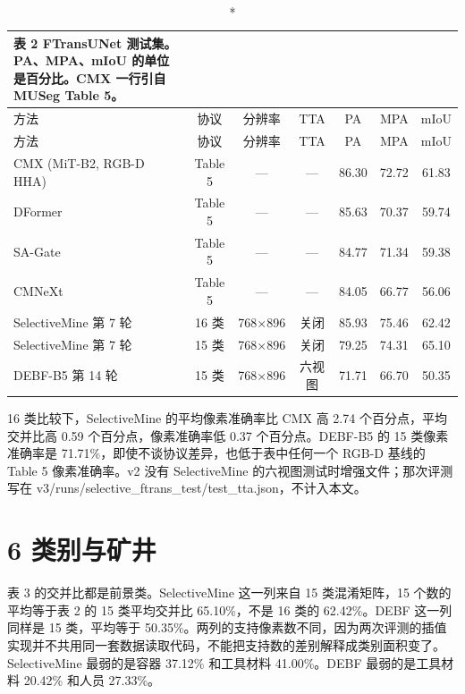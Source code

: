\documentclass[11pt]{article}
\begin{document}
{\footnotesize\setlength{\tabcolsep}{3pt}
\begin{longtable}{lcccccc}
\caption*{表 2  FTransUNet 测试集。PA、MPA、mIoU 的单位是百分比。CMX 一行引自 MUSeg Table 5。}\\
\toprule
方法 & 协议 & 分辨率 & TTA & PA & MPA & mIoU\\
\midrule
\endfirsthead
\toprule
方法 & 协议 & 分辨率 & TTA & PA & MPA & mIoU\\
\midrule
\endhead
CMX (MiT-B2, RGB-D HHA) & Table 5 & — & — & 86.30 & 72.72 & 61.83\\
DFormer & Table 5 & — & — & 85.63 & 70.37 & 59.74\\
SA-Gate & Table 5 & — & — & 84.77 & 71.34 & 59.38\\
CMNeXt & Table 5 & — & — & 84.05 & 66.77 & 56.06\\
SelectiveMine 第 7 轮 & 16 类 & 768×896 & 关闭 & 85.93 & 75.46 & 62.42\\
SelectiveMine 第 7 轮 & 15 类 & 768×896 & 关闭 & 79.25 & 74.31 & 65.10\\
DEBF-B5 第 14 轮 & 15 类 & 768×896 & 六视图 & 71.71 & 66.70 & 50.35\\
\bottomrule
\end{longtable}
}
16 类比较下，SelectiveMine 的平均像素准确率比 CMX 高 2.74 个百分点，平均交并比高 0.59 个百分点，像素准确率低 0.37 个百分点。DEBF-B5 的 15 类像素准确率是 71.71\%，即使不谈协议差异，也低于表中任何一个 RGB-D 基线的 Table 5 像素准确率。v2 没有 SelectiveMine 的六视图测试时增强文件；那次评测写在 v3/runs/selective\_ftrans\_test/test\_tta.json，不计入本文。

\section*{6  类别与矿井}
表 3 的交并比都是前景类。SelectiveMine 这一列来自 15 类混淆矩阵，15 个数的平均等于表 2 的 15 类平均交并比 65.10\%，不是 16 类的 62.42\%。DEBF 这一列同样是 15 类，平均等于 50.35\%。两列的支持像素数不同，因为两次评测的插值实现并不共用同一套数据读取代码，不能把支持数的差别解释成类别面积变了。SelectiveMine 最弱的是容器 37.12\% 和工具材料 41.00\%。DEBF 最弱的是工具材料 20.42\% 和人员 27.33\%。
\end{document}
